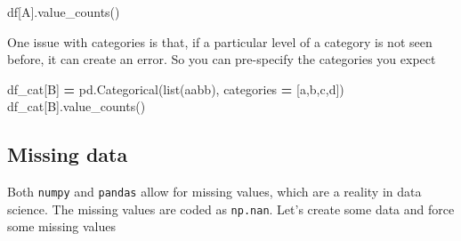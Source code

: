 \documentclass[
  letterpaper,
]{scrbook}
\newenvironment{Shaded}{\begin{snugshade}}{\end{snugshade}}
\newcommand{\BuiltInTok}[1]{#1}
\newcommand{\NormalTok}[1]{#1}
\newcommand{\OperatorTok}[1]{\textcolor[rgb]{0.81,0.36,0.00}{\textbf{#1}}}
\newcommand{\StringTok}[1]{\textcolor[rgb]{0.31,0.60,0.02}{#1}}
\begin{document}
\begin{Shaded}
\begin{Highlighting}[]
\NormalTok{df[}\StringTok{\textquotesingle{}A\textquotesingle{}}\NormalTok{].value\_counts()}
\end{Highlighting}
\end{Shaded}

One issue with categories is that, if a particular level of a category is not seen before, it can create an error. So you can pre-specify the categories you expect

\begin{Shaded}
\begin{Highlighting}[]
\NormalTok{df\_cat[}\StringTok{\textquotesingle{}B\textquotesingle{}}\NormalTok{] }\OperatorTok{=}\NormalTok{ pd.Categorical(}\BuiltInTok{list}\NormalTok{(}\StringTok{\textquotesingle{}aabb\textquotesingle{}}\NormalTok{), categories }\OperatorTok{=}\NormalTok{ [}\StringTok{\textquotesingle{}a\textquotesingle{}}\NormalTok{,}\StringTok{\textquotesingle{}b\textquotesingle{}}\NormalTok{,}\StringTok{\textquotesingle{}c\textquotesingle{}}\NormalTok{,}\StringTok{\textquotesingle{}d\textquotesingle{}}\NormalTok{])}
\NormalTok{df\_cat[}\StringTok{\textquotesingle{}B\textquotesingle{}}\NormalTok{].value\_counts()}
\end{Highlighting}
\end{Shaded}

\hypertarget{missing-data}{%
\subsection{Missing data}\label{missing-data}}

Both \texttt{numpy} and \texttt{pandas} allow for missing values, which are a reality in data science. The missing values are coded as \texttt{np.nan}. Let's create some data and force some missing values
\end{document}
